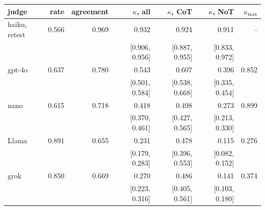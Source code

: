 {\footnotesize
\setlength{\tabcolsep}{5pt}\begin{tabular}{@{}lrrrrrr@{}}
\toprule
judge & rate & agreement & $\kappa$, all & $\kappa$, CoT & $\kappa$, NoT & $\kappa_{\max}$ \\
\midrule
haiku, retest & 0.566 & 0.969 & 0.932 & 0.924 & 0.911 & -- \\
 & & & [0.906, 0.956] & [0.887, 0.955] & [0.833, 0.972] & \\
\midrule
gpt-4o & 0.637 & 0.780 & 0.543 & 0.607 & 0.396 & 0.852 \\
 & & & [0.501, 0.584] & [0.538, 0.668] & [0.335, 0.454] & \\[1pt]
nano & 0.615 & 0.718 & 0.418 & 0.498 & 0.273 & 0.899 \\
 & & & [0.370, 0.461] & [0.427, 0.565] & [0.213, 0.330] & \\[1pt]
Llama & 0.891 & 0.655 & 0.231 & 0.478 & 0.115 & 0.276 \\
 & & & [0.179, 0.283] & [0.396, 0.553] & [0.082, 0.152] & \\[1pt]
grok & 0.850 & 0.669 & 0.270 & 0.486 & 0.141 & 0.374 \\
 & & & [0.223, 0.316] & [0.405, 0.561] & [0.103, 0.180] & \\[1pt]
\bottomrule
\end{tabular}}
